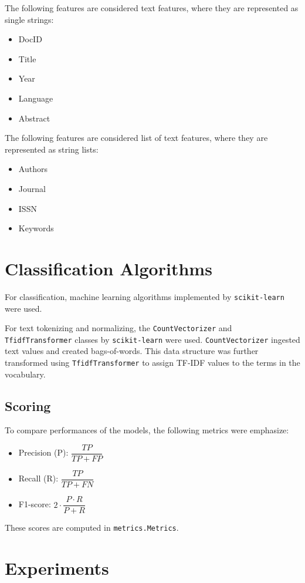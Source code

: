 \documentclass[11pt]{article}
\begin{document}
The following features are considered text features, where they are represented as single strings:
\begin{itemize}
    \item DocID
    \item Title
    \item Year
    \item Language
    \item Abstract
\end{itemize}

The following features are considered list of text features, where they are represented as string lists:
\begin{itemize}
    \item Authors
    \item Journal
    \item ISSN
    \item Keywords
\end{itemize}

\section{Classification Algorithms}
For classification, machine learning algorithms implemented by \texttt{scikit-learn} were used.

For text tokenizing and normalizing, the \texttt{CountVectorizer} and \texttt{TfidfTransformer} classes by \texttt{scikit-learn} were used. \texttt{CountVectorizer} ingested text values and created bags-of-words. This data structure was further transformed using \texttt{TfidfTransformer} to assign TF-IDF values to the terms in the vocabulary.

\subsection{Scoring}
To compare performances of the models, the following metrics were emphasize:
\begin{itemize}
\setlength\itemsep{1em}
    \item Precision (P): $ \dfrac{TP}{TP + FP} $
    \item Recall (R): $ \dfrac{TP}{TP + FN} $
    \item F1-score: $ 2 \cdot \dfrac{P \cdot R}{P+R} $
\end{itemize}

These scores are computed in \texttt{metrics.Metrics}.

\section{Experiments}
\end{document}

